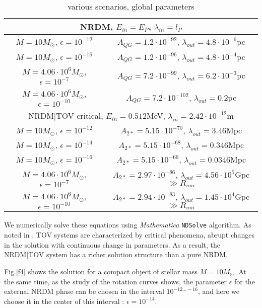 \documentclass{article}
\begin{document}
\begin{table}
\begin{center}{\footnotesize
\caption{various scenarios, global parameters}\label{tab2}

~

\def\arraystretch{1.1}
\begin{tabular}{|c|c|}
\hline
\multicolumn{2}{|c|}{NRDM, $E_{in}=E_P$, $\lambda_{in}=l_P$} \\ \hline
$M=10M_\odot$, $\epsilon=10^{-12}$ & $A_{QG}=1.2\cdot10^{-92}$, $\lambda_{out}=4.8\cdot10^{-6}$pc\\
$M=10M_\odot$, $\epsilon=10^{-16}$ & $A_{QG}=1.2\cdot10^{-96}$, $\lambda_{out}=4.8\cdot10^{-4}$pc\\
$M=4.06\cdot10^6M_\odot$, $\epsilon=10^{-7}$ & $A_{QG}=7.2\cdot10^{-99}$, $\lambda_{out}=6.2\cdot10^{-3}$pc\\
$M=4.06\cdot10^6M_\odot$, $\epsilon=10^{-10}$ & $A_{QG}=7.2\cdot10^{-102}$, $\lambda_{out}=0.2$pc\\
\hline
\multicolumn{2}{|c|}{NRDM|TOV critical, $E_{in}=0.512$MeV, $\lambda_{in}=2.42\cdot10^{-12}$m} \\ \hline
$M=10M_\odot$, $\epsilon=10^{-12}$ & $A_{2*}=5.15\cdot10^{-70}$, $\lambda_{out}=3.46$Mpc\\
$M=10M_\odot$, $\epsilon=10^{-14}$ & $A_{2*}=5.15\cdot10^{-68}$, $\lambda_{out}=0.346$Mpc\\
$M=10M_\odot$, $\epsilon=10^{-16}$ & $A_{2*}=5.15\cdot10^{-66}$, $\lambda_{out}=0.0346$Mpc\\
$M=4.06\cdot10^6M_\odot$, $\epsilon=10^{-7}$ & $A_{2*}=2.97\cdot10^{-86}$, $\lambda_{out}=4.56\cdot10^5$Gpc$\gg R_{uni}$\\
$M=4.06\cdot10^6M_\odot$, $\epsilon=10^{-10}$ & $A_{2*}=2.94\cdot10^{-83}$, $\lambda_{out}=1.45\cdot10^4$Gpc$\gg R_{uni}$\\
\hline
\end{tabular}

}\end{center}
\end{table}

We numerically solve these equations using {\it Mathematica} {\tt NDSolve} algorithm. As noted in \cite {bled2020}, TOV systems are characterized by critical phenomena, abrupt changes in the solution with continuous change in parameters. As a result, the NRDM|TOV system has a richer solution structure than a pure NRDM.

Fig.\ref {f4} shows the solution for a compact object of stellar mass $ M = 10M_ \odot $. At the same time, as the study of the rotation curves \cite {bled2020} shows, the parameter $ \epsilon $ for the external NRDM phase can be chosen in the interval $ 10 ^ {- 12 ...- 16} $, and here we choose it in the center of this interval : $ \epsilon = 10 ^ {- 14} $.
\end{document}
